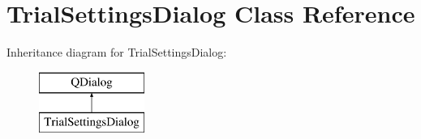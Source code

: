\hypertarget{class_trial_settings_dialog}{\section{Trial\+Settings\+Dialog Class Reference}
\label{class_trial_settings_dialog}
}
Inheritance diagram for Trial\+Settings\+Dialog\+:\begin{figure}[H]
\begin{center}
\leavevmode
\includegraphics[height=2.000000cm]{class_trial_settings_dialog}
\end{center}
\end{figure}
